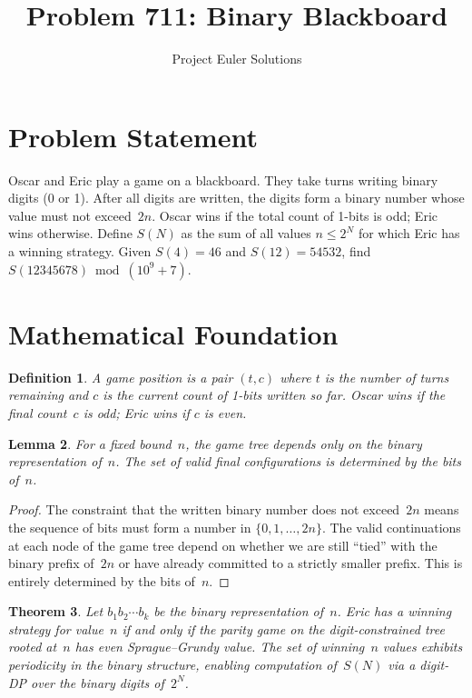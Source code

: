 \documentclass[11pt]{article}
\title{Problem 711: Binary Blackboard}
\author{Project Euler Solutions}
\date{}
\newtheorem{theorem}{Theorem}
\newtheorem{lemma}[theorem]{Lemma}
\newtheorem{definition}[theorem]{Definition}
\begin{document}
\maketitle

\section{Problem Statement}

Oscar and Eric play a game on a blackboard. They take turns writing binary digits (0 or 1). After all digits are written, the digits form a binary number whose value must not exceed~$2n$. Oscar wins if the total count of 1-bits is odd; Eric wins otherwise. Define $S(N)$ as the sum of all values $n \le 2^N$ for which Eric has a winning strategy. Given $S(4) = 46$ and $S(12) = 54532$, find $S(12345678) \bmod (10^9+7)$.

\section{Mathematical Foundation}

\begin{definition}
A \emph{game position} is a pair $(t, c)$ where $t$ is the number of turns remaining and $c$ is the current count of 1-bits written so far. Oscar wins if the final count~$c$ is odd; Eric wins if $c$ is even.
\end{definition}

\begin{lemma}
For a fixed bound~$n$, the game tree depends only on the binary representation of~$n$. The set of valid final configurations is determined by the bits of~$n$.
\end{lemma}

\begin{proof}
The constraint that the written binary number does not exceed~$2n$ means the sequence of bits must form a number in $\{0,1,\ldots,2n\}$. The valid continuations at each node of the game tree depend on whether we are still ``tied'' with the binary prefix of~$2n$ or have already committed to a strictly smaller prefix. This is entirely determined by the bits of~$n$.
\end{proof}

\begin{theorem}
Let $b_1 b_2 \cdots b_k$ be the binary representation of~$n$. Eric has a winning strategy for value~$n$ if and only if the parity game on the digit-constrained tree rooted at~$n$ has even Sprague--Grundy value. The set of winning~$n$ values exhibits periodicity in the binary structure, enabling computation of~$S(N)$ via a digit-DP over the binary digits of~$2^N$.
\end{theorem}
\end{document}

